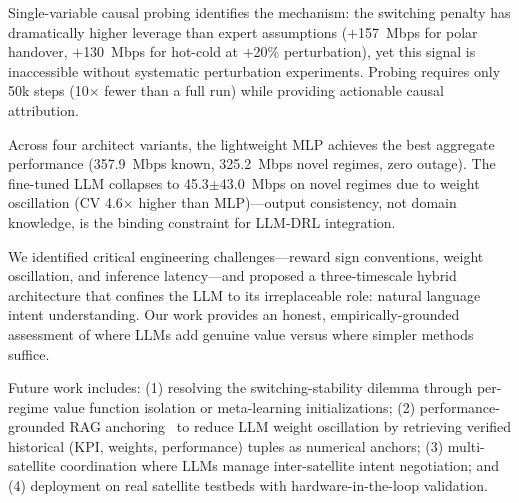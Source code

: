 \documentclass[conference]{IEEEtran}
\begin{document}
Single-variable causal probing identifies the mechanism: the switching penalty has dramatically higher leverage than expert assumptions ($+$157~Mbps for polar handover, $+$130~Mbps for hot-cold at $+$20\% perturbation), yet this signal is inaccessible without systematic perturbation experiments. Probing requires only 50k steps (10$\times$ fewer than a full run) while providing actionable causal attribution.

Across four architect variants, the lightweight MLP achieves the best aggregate performance (357.9~Mbps known, 325.2~Mbps novel regimes, zero outage). The fine-tuned LLM collapses to 45.3$\pm$43.0~Mbps on novel regimes due to weight oscillation (CV 4.6$\times$ higher than MLP)---output consistency, not domain knowledge, is the binding constraint for LLM-DRL integration.

We identified critical engineering challenges---reward sign conventions, weight oscillation, and inference latency---and proposed a three-timescale hybrid architecture that confines the LLM to its irreplaceable role: natural language intent understanding. Our work provides an honest, empirically-grounded assessment of where LLMs add genuine value versus where simpler methods suffice.

Future work includes: (1) resolving the switching-stability dilemma through per-regime value function isolation or meta-learning initializations; (2) performance-grounded RAG anchoring~\cite{lewis2020rag, grounding2025rl} to reduce LLM weight oscillation by retrieving verified historical (KPI, weights, performance) tuples as numerical anchors; (3) multi-satellite coordination where LLMs manage inter-satellite intent negotiation; and (4) deployment on real satellite testbeds with hardware-in-the-loop validation.



\end{document}
